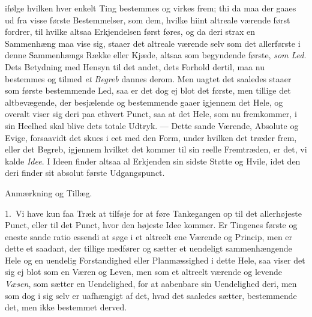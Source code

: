 \documentclass[12pt,a4paper]{book}
\newcommand{\apage}[1]{\marginnote{\footnotesize\textit{[#1]}}}
\begin{document}
ifølge hvilken hver enkelt Ting bestemmes og virkes frem; thi da maa der gaaes ud
fra visse første Bestemmelser, som dem, hvilke hiint altreale værende først
fordrer, til hvilke altsaa Erkjendelsen først føres, og da deri strax en
Sammenhæng maa vise sig, staaer det altreale værende selv som det allerførste i
denne Sammenhængs Række eller Kjæde, altsaa som begyndende første, \emph{som Led}. Dets
Betydning med Hensyn til det andet, dets Forhold dertil, maa nu bestemmes og
tilmed \emph{et Begreb} dannes derom. Men uagtet det saaledes staaer som første
bestemmende Led, saa er det dog ej blot det første, men tillige det altbevægende,
der besjælende og bestemmende gaaer igjennem det Hele, og overalt viser sig deri
paa ethvert Punct, saa at det Hele, som nu fremkommer, i sin Heelhed skal blive
dets totale Udtryk. --- Dette sande Værende, Absolute og Evige, forsaavidt det
skues i eet med den Form, \apage{109} under hvilken det træder frem, eller det Begreb,
igjennem hvilket det kommer til sin reelle Fremtræden, er det, vi kalde
\emph{Idee}. I Ideen finder altsaa al Erkjenden sin sidste Støtte og Hvile, idet
den deri finder sit absolut første Udgangspunct.

\begin{center}Anmærkning og Tillæg.\end{center}

1.~Vi have kun faa Træk at tilføje for at føre Tankegangen op til det allerhøjeste
Punct, eller til det Punct, hvor den højeste Idee kommer. Er Tingenes første og
eneste sande ratio essendi at søge i et altreelt ene Værende og Princip, men er
dette et saadant, der tillige medfører og sætter et uendeligt sammenhængende Hele
og en uendelig Forstandighed eller Planmæssighed i dette Hele, saa viser det sig
ej blot som en Væren og Leven, men som et altreelt værende og levende \emph{Væsen}, som
sætter en Uendelighed, for at aabenbare sin Uendelighed deri, men som dog i sig
selv er uafhængigt af det, hvad det saaledes sætter, bestemmende det, men ikke
bestemmet derved.
\end{document}
